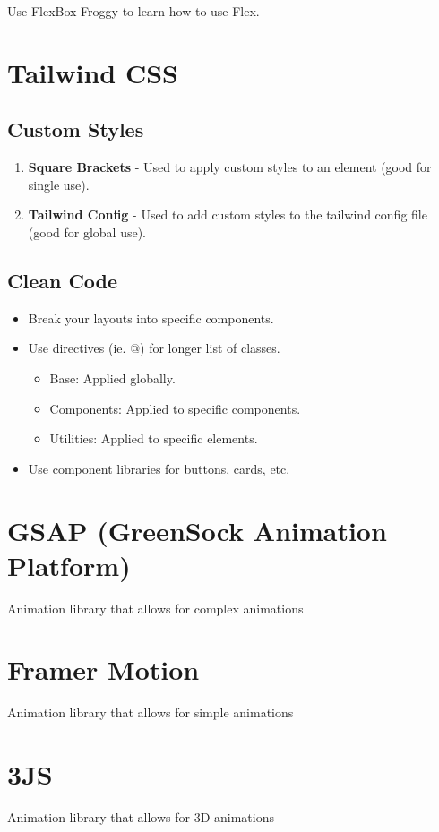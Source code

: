 \documentclass{article}
\begin{document}
\begin{warning}
    Use FlexBox Froggy to learn how to use Flex. 
\end{warning}

\section{Tailwind CSS}
\subsection{Custom Styles}
\begin{definition}
    \begin{enumerate}
        \item \textbf{Square Brackets} - Used to apply custom styles to an element (good for single use).
        \item \textbf{Tailwind Config} - Used to add custom styles to the tailwind config file (good for global use).
    \end{enumerate}
\end{definition}

\subsection{Clean Code}
\begin{definition}
    \begin{itemize}
        \item Break your layouts into specific components.
        \item Use directives (ie. @) for longer list of classes.
        \begin{itemize}
            \item Base: Applied globally.
            \item Components: Applied to specific components.
            \item Utilities: Applied to specific elements.
        \end{itemize}
        \item Use component libraries for buttons, cards, etc.
    \end{itemize}
\end{definition}

\section{GSAP (GreenSock Animation Platform)}
\begin{definition}
    Animation library that allows for complex animations 
\end{definition}

\section{Framer Motion}
\begin{definition}
    Animation library that allows for simple animations
\end{definition}

\section{3JS}
\begin{definition}
    Animation library that allows for 3D animations
\end{definition}
\end{document}

